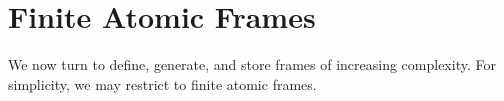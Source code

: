 \documentclass[a4paper, 11pt]{article} %
\newcommand{\tuple}[1]{\langle#1\rangle} %
\newcommand{\set}[1]{\lbrace#1\rbrace} %
\begin{document}
\begin{enumerate}
\end{enumerate}






\section{Finite Atomic Frames}

We now turn to define, generate, and store frames of increasing complexity.
For simplicity, we may restrict to finite atomic frames. %
\end{document}
